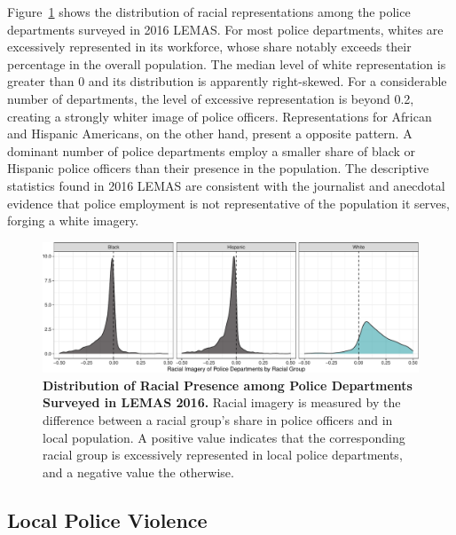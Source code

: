 \documentclass[
  12pt,
]{article}
\begin{document}
Figure~\ref{fig-lemas-density} shows the distribution of racial
representations among the police departments surveyed in 2016 LEMAS. For
most police departments, whites are excessively represented in its
workforce, whose share notably exceeds their percentage in the overall
population. The median level of white representation is greater than 0
and its distribution is apparently right-skewed. For a considerable
number of departments, the level of excessive representation is beyond
0.2, creating a strongly whiter image of police officers.
Representations for African and Hispanic Americans, on the other hand,
present a opposite pattern. A dominant number of police departments
employ a smaller share of black or Hispanic police officers than their
presence in the population. The descriptive statistics found in 2016
LEMAS are consistent with the journalist and anecdotal evidence that
police employment is not representative of the population it serves,
forging a white imagery.

\begin{figure}[tb]

{\centering \includegraphics{quarto_files/figure-pdf/fig-lemas-density-1.pdf}

}

\caption{\label{fig-lemas-density}\textbf{Distribution of Racial
Presence among Police Departments Surveyed in LEMAS 2016.} Racial
imagery is measured by the difference between a racial group's share in
police officers and in local population. A positive value indicates that
the corresponding racial group is excessively represented in local
police departments, and a negative value the otherwise.}

\end{figure}

\hypertarget{local-police-violence}{%
\subsection{Local Police Violence}\label{local-police-violence}}
\end{document}

